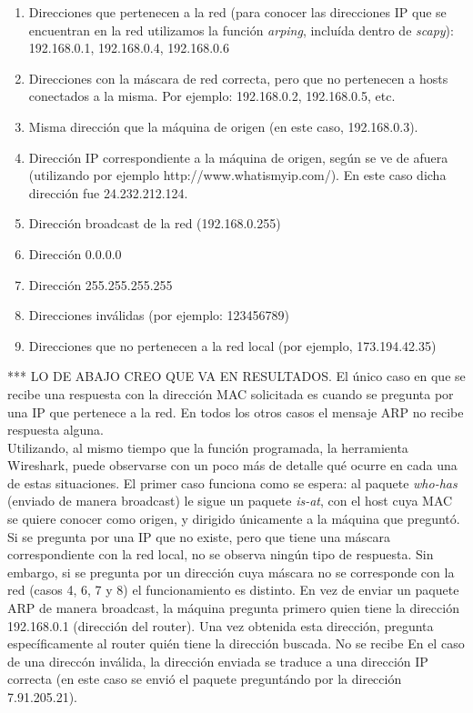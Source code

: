 \begin{enumerate}
 \item Direcciones que pertenecen a la red (para conocer las direcciones IP que se encuentran en la red utilizamos la funci\'on \emph{arping}, inclu\'ida dentro de \emph{scapy}): 192.168.0.1, 192.168.0.4, 192.168.0.6
 \item Direcciones con la m\'ascara de red correcta, pero que no pertenecen a hosts conectados a la misma. Por ejemplo: 192.168.0.2, 192.168.0.5, etc.
 \item Misma direcci\'on que la m\'aquina de origen (en este caso, 192.168.0.3).
 \item Direcci\'on IP correspondiente a la m\'aquina de origen, seg\'un se ve de afuera (utilizando por ejemplo http://www.whatismyip.com/). En este caso dicha direcci\'on fue 24.232.212.124.
 \item Direcci\'on broadcast de la red (192.168.0.255)
 \item Direcci\'on 0.0.0.0
 \item Direcci\'on 255.255.255.255
 \item Direcciones inv\'alidas (por ejemplo: 123456789)
 \item Direcciones que no pertenecen a la red local (por ejemplo, 173.194.42.35)
\end{enumerate}

*** LO DE ABAJO CREO QUE VA EN RESULTADOS.
El \'unico caso en que se recibe una respuesta con la direcci\'on MAC solicitada es cuando se pregunta por una IP que pertenece a la red. En todos los otros casos el mensaje ARP no recibe respuesta alguna.\\

Utilizando, al mismo tiempo que la funci\'on programada, la herramienta Wireshark, puede observarse con un poco m\'as de detalle qu\'e ocurre en cada una de estas situaciones. El primer caso funciona como se espera: al paquete \emph{who-has} (enviado de manera broadcast) le sigue un paquete \emph{is-at}, con el host cuya MAC se quiere conocer como origen, y dirigido \'unicamente a la m\'aquina que pregunt\'o. Si se pregunta por una IP que no existe, pero que tiene una m\'ascara correspondiente con la red local, no se observa ning\'un tipo de respuesta. Sin embargo, si se pregunta por un direcci\'on cuya m\'ascara no se corresponde con la red (casos 4, 6, 7 y 8) el funcionamiento es distinto. En vez de enviar un paquete ARP de manera broadcast, la m\'aquina pregunta primero quien tiene la direcci\'on 192.168.0.1 (direcci\'on del router). Una vez obtenida esta direcci\'on, pregunta espec\'ificamente al router qui\'en tiene la direcci\'on buscada. No se recibe  En el caso de una direcc\'on inv\'alida, la direcci\'on enviada se traduce a una direcci\'on IP correcta (en este caso se envi\'o el paquete pregunt\'ando por la direcci\'on 7.91.205.21).








